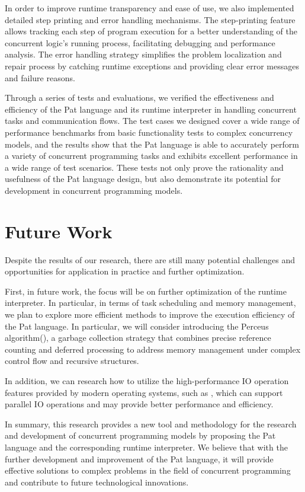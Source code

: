 \documentclass{l4proj}
\begin{document}
In order to improve runtime transparency and ease of use, we also implemented detailed step printing and error handling mechanisms. The step-printing feature allows tracking each step of program execution for a better understanding of the concurrent logic's running process, facilitating debugging and performance analysis. The error handling strategy simplifies the problem localization and repair process by catching runtime exceptions and providing clear error messages and failure reasons.

Through a series of tests and evaluations, we verified the effectiveness and efficiency of the Pat language and its runtime interpreter in handling concurrent tasks and communication flows. The test cases we designed cover a wide range of performance benchmarks from basic functionality tests to complex concurrency models, and the results show that the Pat language is able to accurately perform a variety of concurrent programming tasks and exhibits excellent performance in a wide range of test scenarios. These tests not only prove the rationality and usefulness of the Pat language design, but also demonstrate its potential for development in concurrent programming models.

\section{Future Work}

Despite the results of our research, there are still many potential challenges and opportunities for application in practice and further optimization.

First, in future work, the focus will be on further optimization of the runtime interpreter. In particular, in terms of task scheduling and memory management, we plan to explore more efficient methods to improve the execution efficiency of the Pat language. In particular, we will consider introducing the Perceus algorithm(\cite{reinking_2021_perceus}), a garbage collection strategy that combines precise reference counting and deferred processing to address memory management under complex control flow and recursive structures.

In addition, we can research how to utilize the high-performance IO operation features provided by modern operating systems, such as \cite{_2024_ocamlmulticoreeio}, which can support parallel IO operations and may provide better performance and efficiency.

In summary, this research provides a new tool and methodology for the research and development of concurrent programming models by proposing the Pat language and the corresponding runtime interpreter. We believe that with the further development and improvement of the Pat language, it will provide effective solutions to complex problems in the field of concurrent programming and contribute to future technological innovations.
\end{document}
